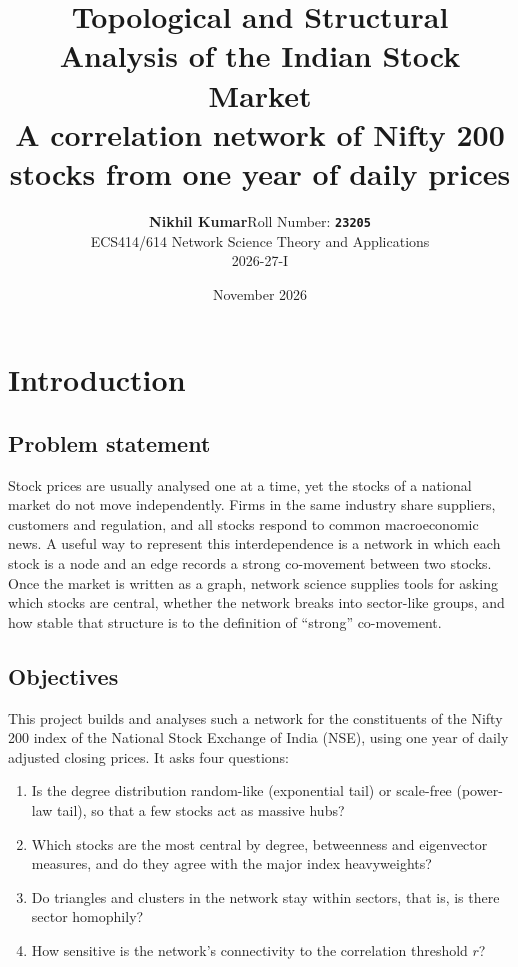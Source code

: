 \documentclass[12pt,a4paper]{report}
\title{\textbf{Topological and Structural Analysis of the Indian Stock Market}\\[0.6em]
\large A correlation network of Nifty 200 stocks from one year of daily prices}
\author{\textbf{Nikhil Kumar}\quad Roll Number: \textbf{\texttt{23205}}\\[0.3em]
ECS414/614 Network Science Theory and Applications\\ 2026-27-I}
\date{November 2026}
\begin{document}
\maketitle

\tableofcontents

\chapter{Introduction}

\section{Problem statement}
Stock prices are usually analysed one at a time, yet the stocks of a national market do not move independently. Firms in the same industry share suppliers, customers and regulation, and all stocks respond to common macroeconomic news. A useful way to represent this interdependence is a network in which each stock is a node and an edge records a strong co-movement between two stocks. Once the market is written as a graph, network science supplies tools for asking which stocks are central, whether the network breaks into sector-like groups, and how stable that structure is to the definition of ``strong'' co-movement.

\section{Objectives}
This project builds and analyses such a network for the constituents of the Nifty 200 index of the National Stock Exchange of India (NSE), using one year of daily adjusted closing prices. It asks four questions:
\begin{enumerate}
  \item Is the degree distribution random-like (exponential tail) or scale-free (power-law tail), so that a few stocks act as massive hubs?
  \item Which stocks are the most central by degree, betweenness and eigenvector measures, and do they agree with the major index heavyweights?
  \item Do triangles and clusters in the network stay within sectors, that is, is there sector homophily?
  \item How sensitive is the network's connectivity to the correlation threshold $r$?
\end{enumerate}
\end{document}
